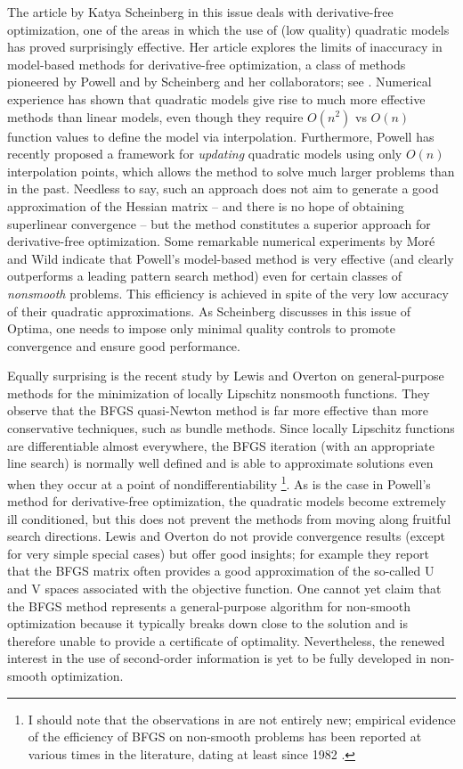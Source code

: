 \documentclass{optima}
\begin{document}
The article by Katya Scheinberg in this issue deals with derivative-free optimization,
one of the areas in which the use of (low quality) quadratic models has proved
surprisingly effective. Her article explores the limits of inaccuracy in model-based
methods for derivative-free optimization, a class of methods pioneered by Powell and
by Scheinberg and her collaborators; see \cite{dfobook}. Numerical experience has
shown that quadratic models give rise to much more effective methods than linear
models, even though they require $O(n^2)$ vs $O(n)$ function values to define the
model via interpolation. Furthermore, Powell \cite{Powe03b} has recently proposed a
framework for \emph{updating} quadratic models using only $O(n)$ interpolation points,
which allows the method to solve much larger problems than in the past. Needless to
say, such an approach does not aim to generate a good approximation of the Hessian
matrix -- and there is no hope of obtaining superlinear convergence -- but the method
constitutes a superior approach for derivative-free optimization. Some remarkable
numerical experiments by Mor\'e and Wild \cite{WildMore09} indicate that Powell's
model-based method is very effective (and clearly outperforms a leading pattern search
method) even for certain classes of \emph{nonsmooth} problems. This efficiency is
achieved in spite of the very low accuracy of their quadratic approximations. As
Scheinberg discusses in this issue of Optima, one needs to impose only minimal quality
controls to promote convergence and ensure good performance.

Equally surprising is the recent study by Lewis and Overton \cite{lewoverton} on
general-purpose methods for the minimization of locally Lipschitz nonsmooth functions.
They observe that the BFGS quasi-Newton method is far more effective than more
conservative techniques, such as bundle methods. Since locally Lipschitz functions are
differentiable almost everywhere, the BFGS iteration (with an appropriate line search)
is normally well defined and is able to approximate solutions even when they occur at
a point of nondifferentiability \footnote{I should note that the observations in
\cite{lewoverton} are not entirely new; empirical evidence of the efficiency of BFGS
on non-smooth problems has been reported at various times in the literature, dating at
least since 1982 \cite{Lemar82, LukVle99}.}. As is the case in Powell's method for
derivative-free optimization, the quadratic models become extremely ill conditioned,
but this does not prevent the methods from moving along fruitful search directions.
Lewis and Overton do not provide convergence results (except for very simple special
cases) but offer good insights; for example they report that the BFGS matrix often
provides a good approximation of the so-called U and V spaces associated with the
objective function. One cannot yet claim that the BFGS method represents a
general-purpose algorithm for non-smooth optimization because it typically breaks down
close to the solution and is therefore unable to provide a certificate of optimality.
Nevertheless, the renewed interest in the use of second-order information is yet to be
fully developed in non-smooth optimization.
\end{document}
